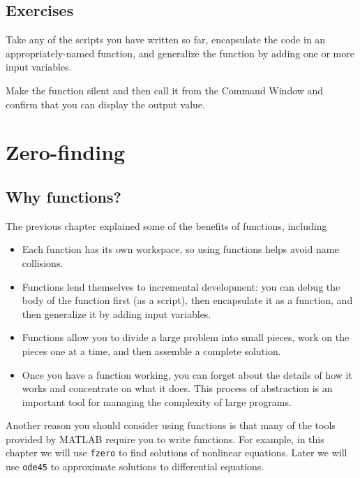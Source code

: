 \documentclass[
]{book}
\begin{document}
\section{Exercises}

\begin{ex}
Take any of the scripts you have written so far, encapsulate
the code in an appropriately-named function, and generalize
the function by adding one or more input variables.

Make the function silent and then call it from the Command
Window and confirm that you can display the output value.
\end{ex}



\chapter{Zero-finding}


\section{Why functions?}

The previous chapter explained some of the benefits of functions,
including

\begin{itemize}

\item Each function has its own workspace, so using functions helps
avoid name collisions.

\item Functions lend themselves to incremental development: you can
debug the body of the function first (as a script), then encapsulate
it as a function, and then generalize it by adding input variables.

\item Functions allow you to divide a large problem into small
pieces, work on the pieces one at a time, and then assemble a
complete solution.

\item Once you have a function working, you can forget about the
details of how it works and concentrate on what it does.  This
process of abstraction is an important tool for managing the
complexity of large programs.

\end{itemize}

Another reason you should consider using functions is that many of the
tools provided by MATLAB require you to write functions.  For example,
in this chapter we will use {\tt fzero} to find solutions of nonlinear
equations.  Later we will use {\tt ode45} to approximate solutions to
differential equations.
\end{document}
